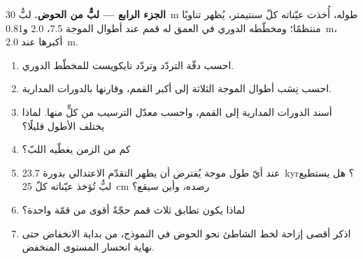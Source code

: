\begin{problem}
\medskip\noindent\textbf{الجزء الرابع --- لبٌّ من الحوض.} لبٌّ
\qty{30}{m} طوله، أُخذت عيّناته كلّ سنتيمتر، يُظهر تناوبًا منتظمًا؛ ومخطّطه الدوري
في العمق له قمم عند أطوال الموجة 7.5، 2.0 و\qty{0.81}{m}،
أكبرها عند \qty{2.0}{m}.
\begin{enumerate}[resume]
\item احسب دقّة التردّد وتردّد نايكويست للمخطّط
  الدوري.
\item احسب نِسَب أطوال الموجة الثلاثة إلى أكبر القمم،
  وقارنها بالدورات المدارية.
\item أسند الدورات المدارية إلى القمم، واحسب معدّل الترسيب من
  كلٍّ منها. لماذا يختلف الأطول قليلًا؟
\item كم من الزمن يغطّيه اللبّ؟
\item عند أيّ طول موجة يُفترض أن يظهر التقدّم الاعتدالي بدورة \qty{23.7}{kyr}؟
  هل يستطيع لبٌّ تُؤخذ عيّناته كلّ \qty{25}{cm} رصده، وأين سيقع؟
\item لماذا يكون تطابق ثلاث قمم حجّةً أقوى من قمّة واحدة؟
\item اذكر أقصى إزاحة لخط الشاطئ نحو الحوض في النموذج،
  من بداية الانخفاض حتى نهاية انحسار المستوى المنخفض.
\end{enumerate}
\end{problem}
